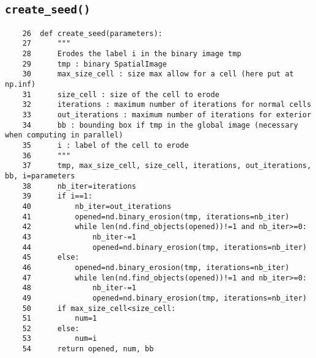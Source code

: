 \documentclass{article}
\begin{document}
\subsection{\texttt{create\_seed()}}
\label{sec:create:seed}
\begin{verbatim}
    26	def create_seed(parameters): 
    27	    """
    28	    Erodes the label i in the binary image tmp
    29	    tmp : binary SpatialImage
    30	    max_size_cell : size max allow for a cell (here put at np.inf)
    31	    size_cell : size of the cell to erode
    32	    iterations : maximum number of iterations for normal cells
    33	    out_iterations : maximum number of iterations for exterior
    34	    bb : bounding box if tmp in the global image (necessary when computing in parallel)
    35	    i : label of the cell to erode
    36	    """
    37	    tmp, max_size_cell, size_cell, iterations, out_iterations, bb, i=parameters
    38	    nb_iter=iterations
    39	    if i==1:
    40	        nb_iter=out_iterations
    41	        opened=nd.binary_erosion(tmp, iterations=nb_iter)
    42	        while len(nd.find_objects(opened))!=1 and nb_iter>=0:
    43	            nb_iter-=1
    44	            opened=nd.binary_erosion(tmp, iterations=nb_iter)
    45	    else:
    46	        opened=nd.binary_erosion(tmp, iterations=nb_iter)
    47	        while len(nd.find_objects(opened))!=1 and nb_iter>=0:
    48	            nb_iter-=1
    49	            opened=nd.binary_erosion(tmp, iterations=nb_iter)
    50	    if max_size_cell<size_cell:
    51	        num=1
    52	    else:
    53	        num=i
    54	    return opened, num, bb
\end{verbatim}
\end{document}
